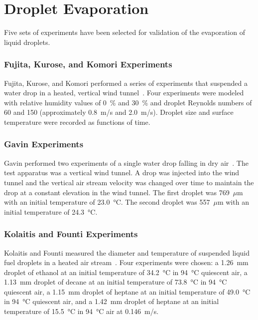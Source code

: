 \section{Droplet Evaporation}
\label{Droplet_Evaporation_Description}

Five sets of experiments have been selected for validation of the evaporation of liquid droplets.

\subsubsection{Fujita, Kurose, and Komori Experiments}
\label{Fujita_exp}

Fujita, Kurose, and Komori performed a series of experiments that suspended a water drop in a heated, vertical wind tunnel~\cite{Fujita}. Four experiments were modeled with relative humidity values of 0~\% and 30~\% and droplet Reynolds numbers of 60 and 150 (approximately 0.8~m/s and 2.0~m/s). Droplet size and surface temperature were recorded as functions of time.

\subsubsection{Gavin Experiments}
\label{Gavin_exp}

Gavin performed two experiments of a single water drop falling in dry air~\cite{Gavin}. The test apparatus was a vertical wind tunnel. A drop was injected into the wind tunnel and the vertical air stream velocity was changed over time to maintain the drop at a constant elevation in the wind tunnel. The first droplet was 769~$\mu$m with an initial temperature of 23.0~\unit{\degreeCelsius}. The second droplet was 557~$\mu$m with an initial temperature of 24.3~\unit{\degreeCelsius}.

\subsubsection{Kolaitis and Founti Experiments}
\label{Kolaitis_exp}

Kolaitis and Founti measured the diameter and temperature of suspended liquid fuel droplets in a heated air stream~\cite{Kolaitis}. Four experiments were chosen: a 1.26~mm droplet of ethanol at an initial temperature of 34.2~\unit{\degreeCelsius} in 94~\unit{\degreeCelsius} quiescent air, a 1.13~mm droplet of decane at an initial temperature of 73.8~\unit{\degreeCelsius} in 94~\unit{\degreeCelsius} quiescent air, a 1.15~mm droplet of heptane at an initial temperature of 49.0~\unit{\degreeCelsius} in 94~\unit{\degreeCelsius} quiescent air, and a 1.42~mm droplet of heptane at an initial temperature of 15.5~\unit{\degreeCelsius} in 94~\unit{\degreeCelsius} air at 0.146~m/s.


